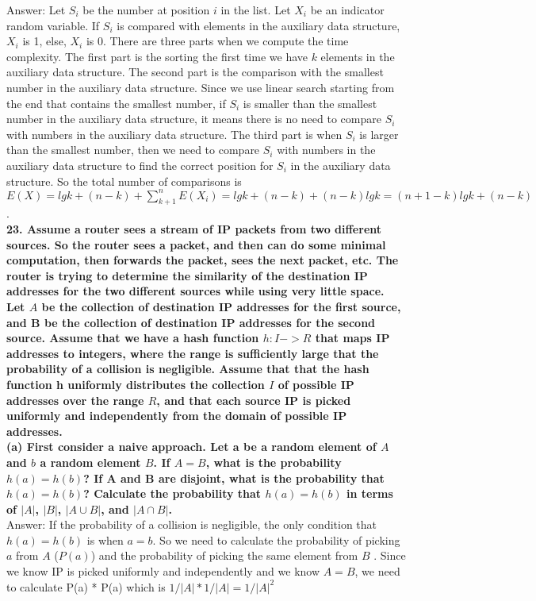 \documentclass{article}
\begin{document}
Answer: Let $S_i$ be the number at position $i$ in the list. Let $X_i$ be an indicator random variable. If $S_i$ is compared with elements in the auxiliary data structure, $X_i$ is 1, else, $X_i$ is 0. There are three parts when we compute the time complexity. The first part is the sorting the first time we have $k$ elements in the auxiliary data structure. The second part is the comparison with the smallest number in the auxiliary data structure. Since we use linear search starting from the end that contains the smallest number, if $S_i$ is smaller than the smallest number in the auxiliary data structure, it means there is no need to compare $S_i$ with numbers in the auxiliary data structure. The third part is when $S_i$ is larger than the smallest number, then we need to compare $S_i$ with numbers in the auxiliary data structure to find the correct position for $S_i$ in the auxiliary data structure. So the total number of comparisons is $E(X) = lgk + (n - k) + \sum_{k+1}^{n}E(X_i) = lgk + (n - k) + (n - k)lgk = (n + 1 - k)lgk + (n - k)$.\\ \newline
\textbf{23. Assume a router sees a stream of IP packets from two different sources. So the router sees a packet, and then can do some minimal computation, then forwards the packet, sees the next packet, etc. The router is trying to determine the similarity of the destination IP addresses for the two different sources while using very little space. Let $A$ be the collection of destination IP addresses for the first source, and B be the collection of destination IP addresses for the second source. Assume that we have a hash function $h: I -> R$ that maps IP addresses to integers, where the range is sufficiently large that the probability of a collision is negligible. Assume that that the hash function h uniformly distributes the collection $I$ of possible IP addresses over the range $R$, and that each source IP is picked uniformly and independently from the domain of possible IP addresses.} \\ \newline
\textbf{(a) First consider a naive approach. Let a be a random element of $A$ and $b$ a random element $B$. If $A = B$, what is the probability $h(a) = h(b)$? If A and B are disjoint, what is the probability that $h(a) = h(b)$? Calculate the probability that $h(a) = h(b)$ in terms of $|A|$, $|B|$, $|A\cup B|$, and $|A\cap B|$.} \\ \newline
Answer: If the probability of a collision is negligible, the only condition that $h(a) = h(b)$ is when $a = b$. So we need to calculate the probability of picking $a$ from $A$ ($P(a)$) and the probability of picking the same element from $B$ . Since we know IP is picked uniformly and independently and we know $A = B$, we need to calculate P(a) * P(a) which is $1/|A| * 1/|A| = 1/|A|^2$ \\
\end{document}
